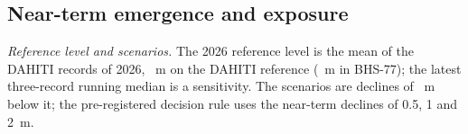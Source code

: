 
\subsection*{Near-term emergence and exposure}
\emph{Reference level and scenarios.} The 2026 reference level is the mean of the  DAHITI records of 2026, ~m on the DAHITI reference (~m in BHS-77); the latest three-record running median is a sensitivity. The scenarios are declines of ~m below it; the pre-registered decision rule uses the  near-term declines of 0.5, 1 and 2~m.


